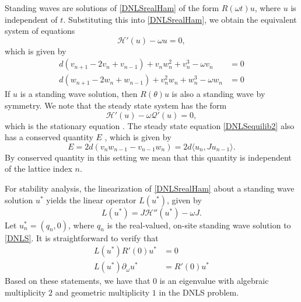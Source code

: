 \documentclass[12pt]{elsarticle}
\begin{document}
Standing waves are solutions of \eqref{DNLSrealHam} of the form $R(\omega t) u$, where $u$ is independent of $t$. Substituting this into \eqref{DNLSrealHam}, we obtain the equivalent system of equations
\begin{equation}\label{DNLSequilib1}
\mathcal{H}'(u) - \omega u = 0,
\end{equation}
which is given by
\begin{equation}\label{DNLSequilib2}
\begin{aligned}
d (v_{n+1} - 2 v_n + v_{n-1}) + v_n w_n^2 + v_n^3 - \omega v_n &= 0 \\
d (w_{n+1} - 2 w_n + w_{n-1}) + v_n^2 w_n + w_n^3 - \omega w_n &= 0
\end{aligned}
\end{equation}
If $u$ is a standing wave solution, then $R(\theta) u$ is also a standing wave by symmetry. We note that the steady state system has the form
\begin{equation}
\mathcal{H}'(u) - \omega \mathcal{Q}'(u) = 0,
\end{equation}
which is the stationary equation \cite[(2.15)]{Grillakis1987}. The steady state equation \eqref{DNLSequilib2} also has a conserved quantity $E$ \cite{Johansson2000}, which is given by
\begin{equation}\label{DNLSE}
E = 2d(v_n w_{n-1} - v_{n-1} w_n) = 2d \langle u_n, J u_{n-1} \rangle.
\end{equation}
By conserved quantity in this setting we mean
that this quantity is independent of the lattice
index $n$.

For stability analysis, the linearization of \eqref{DNLSrealHam} about a standing wave solution $u^*$ 
yields the linear operator $L(u^*)$, given by 
\begin{equation}\label{DNLSeigproblem}
L(u^*) = J \mathcal{H}''(u^*)  - \omega J.
\end{equation}
Let $u^*_n = (q_n, 0)$, where $q_n$ is the real-valued, on-site standing wave solution to \eqref{DNLS}. It is straightforward to verify that
\begin{equation}\label{DNLSkernel1}
\begin{aligned}
L(u^*) R'(0) u^* &= 0 \\
L(u^*) \partial_\omega u^* &= R'(0) u^*
\end{aligned}
\end{equation}
Based on these statements, we have that $0$ is an
eigenvalue with algebraic multiplicity $2$ and
geometric multiplicity $1$ in the DNLS problem. 
\end{document}
